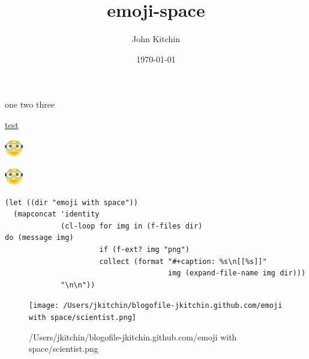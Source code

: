 \documentclass[11pt]{article}
\author{John Kitchin}
\date{\today}
\title{emoji-space}
\begin{document}
\tableofcontents

one two three

\href{emoji with space/scientist.png}{test}


\includegraphics[width=.9\linewidth]{emoji with space/scientist.png}

\includegraphics[width=.9\linewidth]{./emoji with space/scientist.png}

\begin{verbatim}
(let ((dir "emoji with space"))
  (mapconcat 'identity
             (cl-loop for img in (f-files dir)
do (message img)
                      if (f-ext? img "png")
                      collect (format "#+caption: %s\n[[%s]]"
                                      img (expand-file-name img dir)))
             "\n\n"))
\end{verbatim}

\begin{figure}[htb]
\centering
\texttt{[image: /Users/jkitchin/blogofile-jkitchin.github.com/emoji with space/scientist.png]}
\caption{/Users/jkitchin/blogofile-jkitchin.github.com/emoji with space/scientist.png}
\end{figure}
\end{document}
